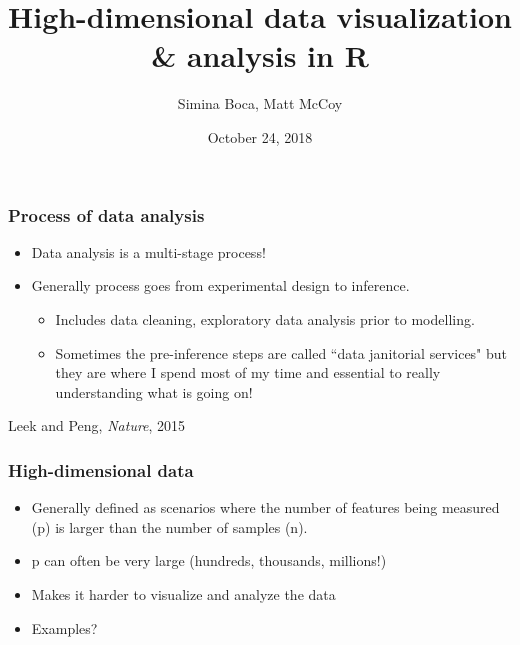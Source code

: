 \documentclass{beamer}
\title[High-dimensional data]{High-dimensional data visualization \& analysis in R}
\author{Simina Boca, Matt McCoy}
\date{October 24, 2018}
\institute{Innovation Center for Biomedical Informatics, Georgetown University Medical Center} \vspace{1.5cm}
\begin{document}
\begin{frame}
\titlepage
\end{frame}


\begin{frame}
\frametitle{Process of data analysis}

\begin{itemize}
\item Data analysis is a multi-stage process!
\item Generally process goes from experimental design to inference.
\begin{itemize}
\item Includes data cleaning, exploratory data analysis prior to modelling.
\item Sometimes the pre-inference steps are called ``data janitorial services" but they are where I spend most
of my time and essential to really understanding what is going on!
\end{itemize}
\end{itemize}

\vspace{0.4cm}

Leek and Peng, \textit{Nature}, 2015

\end{frame}


\begin{frame}
\frametitle{High-dimensional data}

\begin{itemize}
\item Generally defined as scenarios where the number of features being measured (p) is larger than the number of samples (n).
\item p can often be very large (hundreds, thousands, millions!)
\item Makes it harder to visualize and analyze the data
\item Examples?

\end{itemize}

\end{frame}

\end{document}
